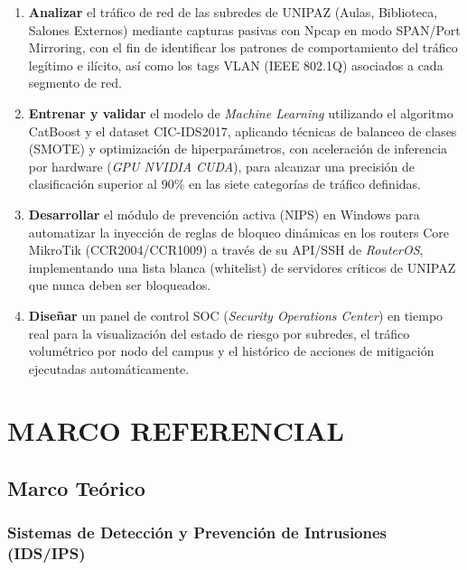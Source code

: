 \documentclass[12pt, letterpaper, oneside]{report}
\begin{document}
\begin{enumerate}[leftmargin=*, label=\textbf{OE-\arabic*.}]

  \item \textbf{Analizar} el tráfico de red de las subredes de UNIPAZ (Aulas, Biblioteca, Salones Externos) mediante capturas pasivas con Npcap en modo SPAN/Port Mirroring, con el fin de identificar los patrones de comportamiento del tráfico legítimo e ilícito, así como los tags VLAN (IEEE 802.1Q) asociados a cada segmento de red.

  \item \textbf{Entrenar y validar} el modelo de \textit{Machine Learning} utilizando el algoritmo CatBoost y el dataset CIC-IDS2017, aplicando técnicas de balanceo de clases (SMOTE) y optimización de hiperparámetros, con aceleración de inferencia por hardware (\textit{GPU NVIDIA CUDA}), para alcanzar una precisión de clasificación superior al 90\% en las siete categorías de tráfico definidas.

  \item \textbf{Desarrollar} el módulo de prevención activa (NIPS) en Windows para automatizar la inyección de reglas de bloqueo dinámicas en los routers Core MikroTik (CCR2004/CCR1009) a través de su API/SSH de \textit{RouterOS}, implementando una lista blanca (whitelist) de servidores críticos de UNIPAZ que nunca deben ser bloqueados.

  \item \textbf{Diseñar} un panel de control SOC (\textit{Security Operations Center}) en tiempo real para la visualización del estado de riesgo por subredes, el tráfico volumétrico por nodo del campus y el histórico de acciones de mitigación ejecutadas automáticamente.

\end{enumerate}

\chapter{MARCO REFERENCIAL}

\section{Marco Teórico}

\subsection{Sistemas de Detección y Prevención de Intrusiones (IDS/IPS)}
\end{document}
